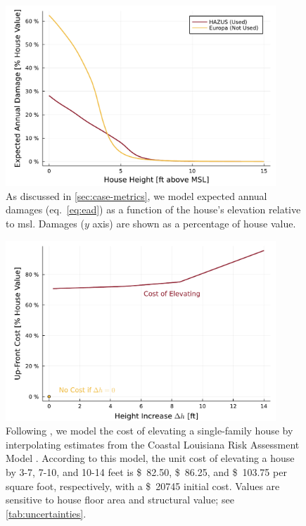 \documentclass[11pt]{article}
\newcommand{\usd}[1]{\SI{#1}[\$]{}}
\begin{document}
\begin{figure}
    \centering
    \includegraphics[width=4in]{cost-expected-damage-emulator}
    \caption{
        As discussed in \cref{sec:case-metrics}, we model expected annual damages (eq.~\ref{eq:ead}) as a function of the house's elevation relative to \gls{msl}.
        Damages ($y$ axis) are shown as a percentage of house value.
    }\label{fig:cost-expected-damage-emulator}
\end{figure}

\begin{figure}
    \centering
    \includegraphics[width=4in]{cost-up-front}
    \caption{
        Following \citet{zarekarizi_suboptimal:2020}, we model the cost of elevating a single-family house by interpolating estimates from the Coastal Louisiana Risk Assessment Model \citep{johnson_clara:2013}.
        According to this model, the unit cost of elevating a house by 3-7, 7-10, and 10-14 feet is \usd{82.50}, \usd{86.25}, and \usd{103.75} per square foot, respectively, with a \usd{20745} initial cost.
        Values are sensitive to house floor area and structural value; see \cref{tab:uncertainties}.
    }\label{fig:cost-up-front}
\end{figure}
\end{document}
